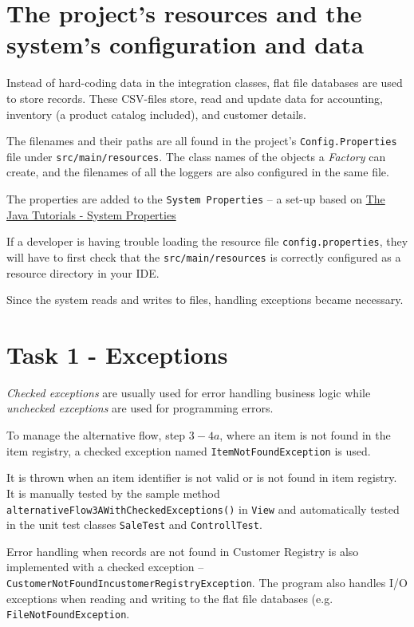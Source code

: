 \documentclass[a4paper]{scrreprt}
\begin{document}
\section*{The project's resources and the system's configuration and data}
Instead of hard-coding data in the integration classes,
flat file databases are used to store records.
These CSV-files store,
read and update data for accounting, inventory (a product catalog included), and customer details.

The filenames and their paths are all found in the project's \verb|Config.Properties|
file under \verb|src/main/resources|.
The class names of the objects a \emph{Factory} can create, and the filenames of all the loggers are also
configured in the same file.

The properties are added to the \verb|System Properties| -- a set-up based on
\href{https://docs.oracle.com/javase/tutorial/essential/environment/sysprop.html}{The Java\texttrademark{} Tutorials - System Properties}

If a developer is having trouble loading the resource file \verb|config.properties|,
they will have to first check that the \verb|src/main/resources|
is correctly configured as a resource directory in your IDE.

Since the system reads and writes to files, handling exceptions became necessary.

\section*{Task 1 - Exceptions}
\emph{Checked exceptions} are usually used for error handling business logic while
\emph{unchecked exceptions} are used for programming errors.

To manage the alternative flow, step $3-4a$,
where an item is not found in the item registry,
a checked exception named \texttt{ItemNotFoundException} is used.

It is thrown when an item identifier is not valid or is not found in item registry.
It is manually tested by the sample method \texttt{alternativeFlow3AWithCheckedExceptions()}
in \verb|View| and automatically tested in the unit test classes \verb|SaleTest| and \verb|ControllTest|.

Error handling when records are not found in Customer Registry is
also implemented with
a checked exception -- \texttt{CustomerNotFoundIncustomerRegistryException}.
The program also handles I/O exceptions when reading and writing to the flat file databases (e.g. \texttt{FileNotFoundException}.
\end{document}
